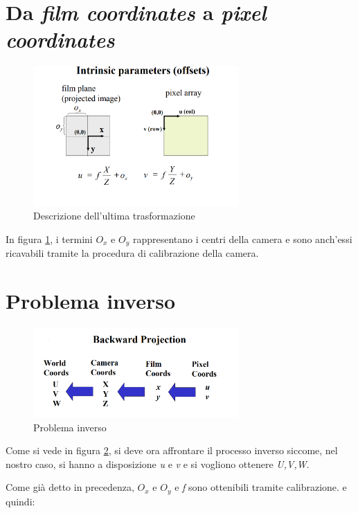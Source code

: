 \section{Da \textit{film coordinates} a \textit{pixel coordinates}}

\begin{figure}[H]
	\centering
	\includegraphics[width=0.7\textwidth]{Immagini/intrinsic_parameters.png}
	\caption{Descrizione dell'ultima trasformazione}
	\label{fig:intrinsic_parameters}
\end{figure}
In figura \ref{fig:intrinsic_parameters}, i termini $ O_{x}$ e $ O_{y} $ rappresentano i centri della camera e sono anch'essi ricavabili tramite la procedura di calibrazione della camera.

\section{Problema inverso}
\begin{figure}[H]
	\centering
	\includegraphics[width=0.7\textwidth]{Immagini/backward.png}
	\caption{Problema inverso}
	\label{fig:backward}
\end{figure}

Come si vede in figura \ref{fig:backward}, si deve ora affrontare il processo inverso siccome, nel nostro caso, si hanno a disposizione \textit{u} e \textit{v} e si vogliono ottenere \textit{U,V,W}.

Come già detto in precedenza, $ O_{x}$ e $ O_{y} $ e \textit{f} sono ottenibili tramite calibrazione. e quindi:

